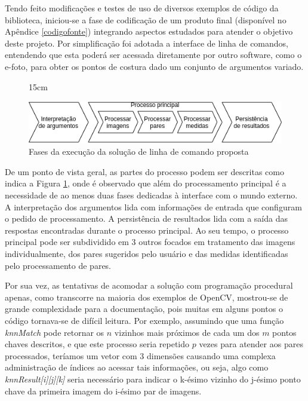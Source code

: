 Tendo feito modificações e testes de uso de diversos exemplos de código da biblioteca, iniciou-se a fase de codificação de um produto final (disponível no Apêndice \ref{codigofonte}) integrando aspectos estudados para atender o objetivo deste projeto. Por simplificação foi adotada a interface de linha de comandos, entendendo que esta poderá ser acessada diretamente por outro software, como o e-foto, para obter os pontos de costura dado um conjunto de argumentos variado.

\begin{figure}[!h]{15cm}
  \caption{Fases da execução da solução de linha de comando proposta} \label{macro}
  \includegraphics[width=\hsize]{figuras/macro.png}
\end{figure}

De um ponto de vista geral, as partes do processo podem ser descritas como indica a Figura \ref{macro}, onde é observado que além do processamento principal é  a necessidade de ao menos duas fases dedicadas à interface com o mundo externo. A interpretação dos argumentos lida com informações de entrada que configuram o pedido de processamento. A persistência de resultados lida com a saída das respostas encontradas durante o processo principal. Ao seu tempo, o processo principal pode ser subdividido em 3 outros focados em tratamento das imagens individualmente, dos pares sugeridos pelo usuário e das medidas identificadas pelo processamento de pares.

Por sua vez, as tentativas de acomodar a solução com programação procedural apenas, como transcorre na maioria dos exemplos de OpenCV, mostrou-se de grande complexidade para a documentação, pois muitas em alguns pontos o código tornava-se de difícil leitura. Por exemplo, assumindo que uma função \textit{knnMatch} pode retornar os $n$ vizinhos mais próximos de cada um dos $m$ pontos chaves descritos, e que este processo seria repetido $p$ vezes para atender aos pares processados, 
teríamos um vetor com 3 dimensões causando uma complexa administração de índices ao acessar tais informações, ou seja, algo como \textit{knnResult[i][j][k]} seria necessário para indicar o k-ésimo vizinho do j-ésimo ponto chave da primeira imagem do i-ésimo par de imagens.

